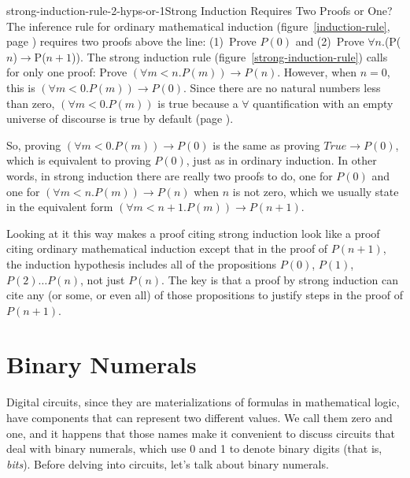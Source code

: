 \begin{aside}{strong-induction-rule-2-hyps-or-1}{Strong Induction Requires Two Proofs or One?}
The inference rule for ordinary mathematical induction
(figure~\ref{induction-rule}, page \pageref{induction-rule})
requires two proofs above the line:
(1)~Prove $P(0)$ and (2)~Prove $\forall$$n$.(P($n$)$\rightarrow$P($n+1$)).
The strong induction rule
(figure~\ref{strong-induction-rule})
calls for only one proof:
Prove $(\forall m<n.P(m))\rightarrow P(n)$.
However, when $n = 0$, this is
$(\forall m<0.P(m))\rightarrow P(0)$.
Since there
are no natural numbers less than zero,
$(\forall m<0.P(m))$ is true because
a $\forall$ quantification with an empty universe of discourse
is true by default
(page \pageref{empty-forall}).

So, proving $(\forall m<0.P(m))\rightarrow P(0)$
is the same as proving $True \rightarrow P(0)$,
which is equivalent to proving $P(0)$,
just as in ordinary induction.
In other words, in strong induction there are really two proofs to do,
one for $P(0)$ and one for $(\forall m<n.P(m))\rightarrow P(n)$
when $n$ is not zero, which we usually state in the
equivalent form $(\forall m<n+1.P(m))\rightarrow P(n+1)$.

Looking at it this way makes a proof citing strong induction look like
a proof citing ordinary mathematical induction except that
in the proof of $P(n+1)$, the
induction hypothesis
includes all of the propositions $P(0)$, $P(1)$, $P(2) \dots P(n)$, not just $P(n)$.
The key is that a proof by strong induction
can cite any (or some, or even all) of those propositions
to justify steps in the proof of
$P(n+1)$.
\end{aside}

\section{Binary Numerals}
\label{sec:binary-numerals}

Digital circuits, since they are materializations of formulas in mathematical logic,
have components that can represent two different values.
We call them zero and one, and it happens that those names
make it convenient to discuss circuits that deal with binary numerals,
which use 0 and 1 to denote binary digits (that is,
\emph{bits}).
Before delving into circuits, let's talk about binary numerals.

